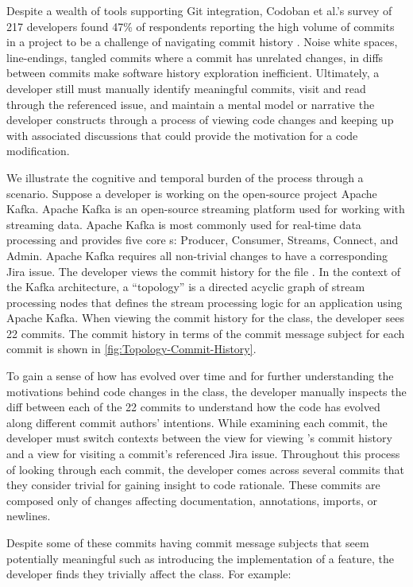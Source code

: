 Despite a wealth of tools supporting Git integration, Codoban et al.'s survey of 217 developers found 47\% of respondents reporting the high volume of commits in a project to be a challenge of navigating commit history \cite{codoban_software_2015}. 
Noise \eg white spaces, line-endings, tangled commits where a commit has unrelated changes, \etc in diffs between commits make software history exploration inefficient. 
Ultimately, a developer still must manually identify meaningful commits, visit and read through the referenced issue, and maintain a mental model or narrative the developer constructs through a process of viewing code changes and keeping up with associated discussions that could provide the motivation for a code modification. 

We illustrate the cognitive and temporal burden of the process through a scenario.
Suppose a developer is working on the open-source project Apache Kafka. 
Apache Kafka is an open-source streaming platform used for working with streaming data. 
Apache Kafka is most commonly used for real-time data processing and provides five core s: 
Producer, Consumer, Streams, Connect, and Admin.
Apache Kafka requires all non-trivial changes to have a corresponding Jira issue. 
The developer views the commit history for the file .
In the context of the Kafka architecture, a ``topology'' is a directed acyclic graph of stream processing nodes that defines the stream processing logic for an application using Apache Kafka.
When viewing the commit history for the  class, the developer sees 22 commits.
The commit history in terms of the commit message subject for each commit is shown in \autoref{fig:Topology-Commit-History}.

To gain a sense of how  has evolved over time and for further understanding the motivations behind code changes in the class, 
the developer manually inspects the diff between each of the 22 commits to understand how the code has evolved along different commit authors' intentions.
While examining each commit, the developer must switch contexts between the view for viewing 's commit history and a view for visiting a commit's referenced Jira issue.
Throughout this process of looking through each commit, the developer comes across several commits that they consider trivial for gaining insight to code rationale. 
These commits are composed only of changes affecting documentation, annotations, imports, or newlines. 

Despite some of these commits having commit message subjects that seem potentially meaningful such as introducing the implementation of a feature, 
the developer finds they trivially affect the  class. 
For example: 

